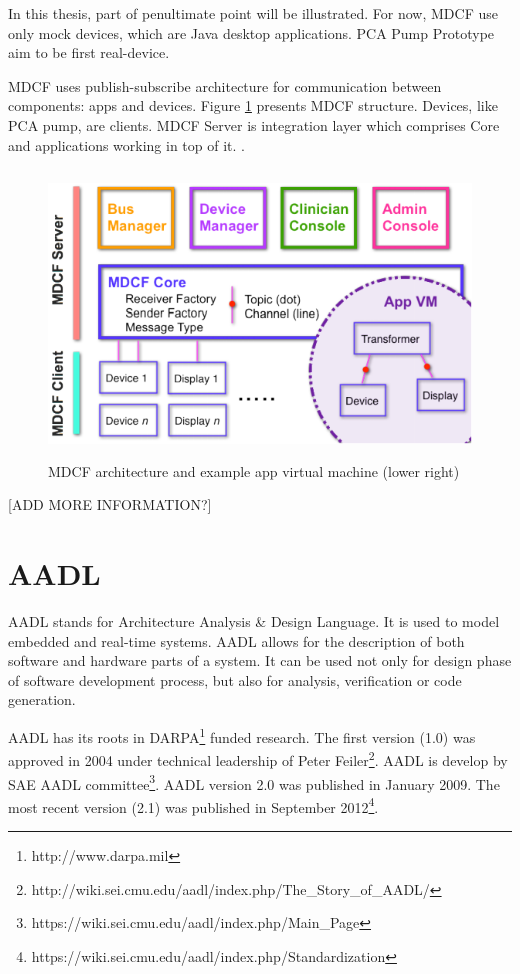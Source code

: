 In this thesis, part of penultimate point will be illustrated. For now, MDCF use only mock devices, which are Java desktop applications. PCA Pump Prototype aim to be first real-device.

MDCF uses publish-subscribe architecture for communication between components: apps and devices. Figure \ref{figure:mdcf} presents MDCF structure. Devices, like PCA pump, are clients. MDCF Server is integration layer which comprises Core and applications working in top of it. \cite{MDCF:Paper}.

\begin{figure}[ht]%
    \begin{center}
    	\includegraphics[height=3in]{figures/mdcf.png}    	
    \end{center}
    \caption{MDCF architecture and example app virtual machine (lower right)}
    \label{figure:mdcf}
\end{figure}

[ADD MORE INFORMATION?]



\section{AADL}
\label{background:aadl}

AADL stands for Architecture Analysis \& Design Language. It is used to model embedded and real-time systems. AADL allows for the description of both software and hardware parts of a system. It can be used not only for design phase of software development process, but also for analysis, verification or code generation.

AADL has its roots in DARPA\footnote{http://www.darpa.mil} funded research. The first version (1.0) was approved in 2004 under technical leadership of Peter Feiler\footnote{http://wiki.sei.cmu.edu/aadl/index.php/The\_Story\_of\_AADL/}. AADL is develop by SAE AADL committee\footnote{https://wiki.sei.cmu.edu/aadl/index.php/Main\_Page}. AADL version 2.0 was published in January 2009. The most recent version (2.1) was published in September 2012\footnote{https://wiki.sei.cmu.edu/aadl/index.php/Standardization}.

